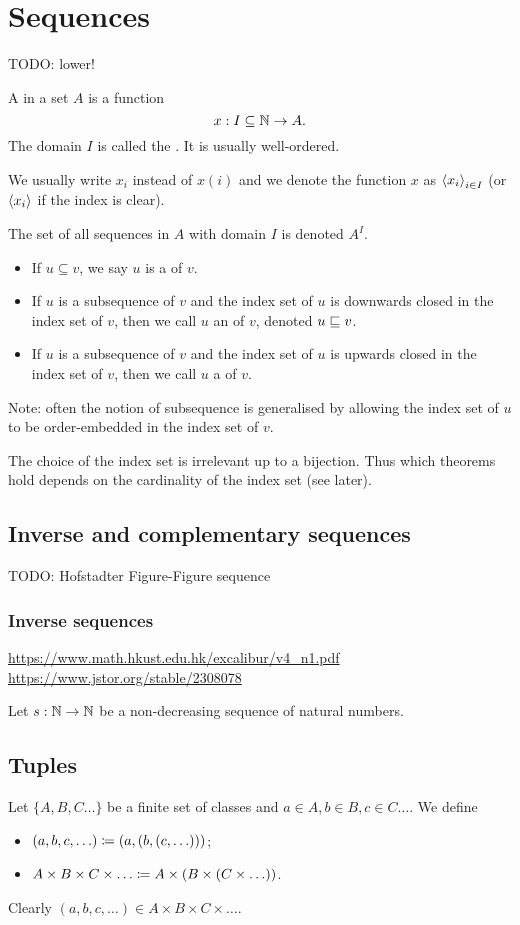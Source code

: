 \section{Sequences }
TODO: lower!
\begin{definition}
A  in a set $A$ is a function
\[ x:I\subseteq\mathbb{N}\to A. \]
The domain $I$ is called the . It is usually well-ordered.

We usually write $x_i$ instead of $x(i)$ and we denote the function $x$ as $\left\langle x_i \right\rangle_{i\in I}$ (or $\left\langle x_i \right\rangle$ if the index is clear).

The set of all sequences in $A$ with domain $I$ is denoted $A^I$.

\begin{itemize}
\item If $u \subseteq v$, we say $u$ is a  of $v$.
\item If $u$ is a subsequence of $v$ and the index set of $u$ is downwards closed in the index set of $v$, then we call $u$ an  of $v$, denoted $u \sqsubseteq v$.
\item If $u$ is a subsequence of $v$ and the index set of $u$ is upwards closed in the index set of $v$, then we call $u$ a  of $v$.
\end{itemize}
Note: often the notion of subsequence is generalised by allowing the index set of $u$ to be order-embedded in the index set of $v$.
\end{definition}
The choice of the index set is irrelevant up to a bijection. Thus which theorems hold depends on the cardinality of the index set (see later).

\subsection{Inverse and complementary sequences}
TODO: Hofstadter Figure-Figure sequence
\subsubsection{Inverse sequences}
\url{https://www.math.hkust.edu.hk/excalibur/v4_n1.pdf}
\url{https://www.jstor.org/stable/2308078}
\begin{definition}
Let $s:\mathbb{N}\to\mathbb{N}$ be a non-decreasing sequence of natural numbers.
\end{definition}


\subsection{Tuples}
\begin{definition}
Let $\{A,B,C \ldots \}$ be a finite set of classes and $a\in A, b\in B, c\in C \ldots$. We define
\begin{itemize}
\item $(a,b,c,\ldots) \coloneqq (a, (b,(c,\ldots)))$;
\item $A\times B\times C\times\ldots \coloneqq A\times(B\times (C\times \ldots))$.
\end{itemize}
\end{definition}
Clearly $(a,b,c,\ldots)\in A\times B\times C\times\ldots$.

